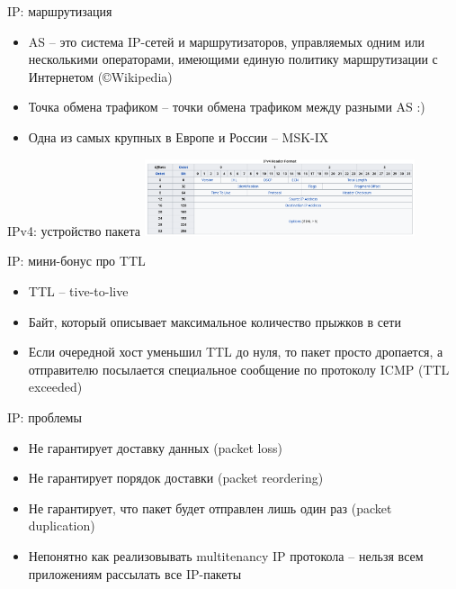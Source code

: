 \documentclass[10pt,pdf,hyperref={unicode}]{beamer}
\begin{document}
\begin{frame}{IP: маршрутизация}
\begin{itemize}
    \item AS -- это система IP-сетей и маршрутизаторов, управляемых одним или несколькими операторами, имеющими единую политику маршрутизации с Интернетом (\copyright Wikipedia)
    \item Точка обмена трафиком -- точки обмена трафиком между разными AS :)
    \item Одна из самых крупных в Европе и России -- MSK-IX
\end{itemize}
\end{frame}

\begin{frame}{IPv4: устройство пакета}
\includegraphics[width=300px]{ipv4_header.png}
\end{frame}

\begin{frame}{IP: мини-бонус про TTL}
\begin{itemize}
    \item TTL -- tive-to-live
    \item Байт, который описывает максимальное количество прыжков в сети
    \item Если очередной хост уменьшил TTL до нуля, то пакет просто дропается, а отправителю посылается специальное сообщение по протоколу ICMP (TTL exceeded)
\end{itemize}
\end{frame}

\begin{frame}{IP: проблемы}
\begin{itemize}
    \item Не гарантирует доставку данных (packet loss)
    \item Не гарантирует порядок доставки (packet reordering)
    \item Не гарантирует, что пакет будет отправлен лишь один раз (packet duplication)
    \item Непонятно как реализовывать multitenancy IP протокола -- нельзя всем приложениям рассылать все IP-пакеты
\end{itemize}
\end{frame}
\end{document}

